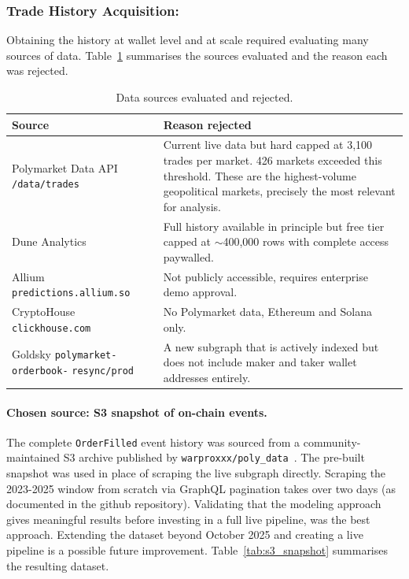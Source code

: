 \documentclass[11pt]{article}
\begin{document}
\subsubsection*{Trade History Acquisition:}
Obtaining the history at wallet level and at scale required evaluating
many sources of data. Table~\ref{tab:rejected_sources} summarises the
sources evaluated and the reason each was rejected.

\begin{table}[H]
\centering
\caption{Data sources evaluated and rejected.}
\label{tab:rejected_sources}
\small
\begin{tabularx}{\textwidth}{p{4.2cm} X}
\toprule
\textbf{Source} & \textbf{Reason rejected} \\
\midrule
Polymarket Data API \newline \texttt{/data/trades}
& Current live data but hard capped at 3,100 trades per market.
      426 markets exceeded this threshold. These are the highest-volume
      geopolitical markets, precisely the most relevant for analysis. \\
\addlinespace[3pt]
Dune Analytics
& Full history available in principle but free tier capped at
      $\sim$400,000 rows with complete access paywalled. \\
\addlinespace[3pt]
Allium \texttt{predictions.allium.so}
& Not publicly accessible, requires enterprise demo approval. \\
\addlinespace[3pt]
CryptoHouse \texttt{clickhouse.com}
& No Polymarket data, Ethereum and Solana only. \\
\addlinespace[3pt]
Goldsky \texttt{polymarket-orderbook-} \newline \texttt{resync/prod}
& A new subgraph that is actively indexed but does not include maker and taker
      wallet addresses entirely. \\
\bottomrule
\end{tabularx}
\end{table}

\paragraph{Chosen source: S3 snapshot of on-chain events.}


The complete \texttt{OrderFilled} event history was sourced from a community-maintained S3 archive published by
\texttt{warproxxx/poly\_data}~\cite{poly_data_github}.
The pre-built snapshot was used in place of scraping the live subgraph
directly. Scraping the 2023-2025 window from scratch via GraphQL pagination takes over two days (as documented in the github repository). Validating that the modeling approach gives meaningful results before investing in a full live pipeline, was the best approach.
Extending the dataset beyond October 2025 and creating a live pipeline is a possible future improvement.
Table~\ref{tab:s3_snapshot} summarises the resulting dataset.
\end{document}
